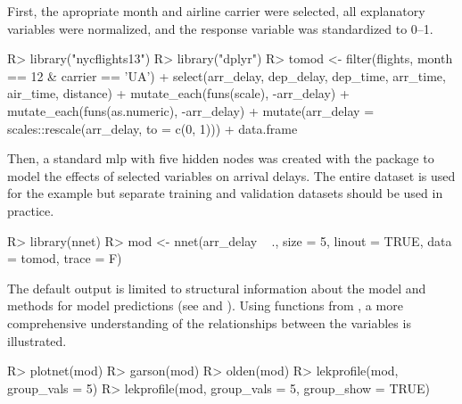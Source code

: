 \documentclass[article,shortnames]{jss}
\begin{document}
First, the apropriate month and airline carrier were selected, all explanatory variables were normalized, and the response variable was standardized to 0--1.
\begin{Schunk}
\begin{Sinput}
R> library("nycflights13")
R> library("dplyr")
R> tomod <- filter(flights, month == 12 & carrier == 'UA') %
+   select(arr_delay, dep_delay, dep_time, arr_time, air_time, distance) %
+   mutate_each(funs(scale), -arr_delay) %
+   mutate_each(funs(as.numeric), -arr_delay) %
+   mutate(arr_delay = scales::rescale(arr_delay, to = c(0, 1))) %
+   data.frame
\end{Sinput}
\end{Schunk}
Then, a standard \ac{mlp} with five hidden nodes was created with the  package to model the effects of selected variables on arrival delays. The entire dataset is used for the example but separate training and validation datasets should be used in practice.  
\begin{Schunk}
\begin{Sinput}
R> library(nnet)
R> mod <- nnet(arr_delay ~ ., size = 5, linout = TRUE, data = tomod, trace = F)  
\end{Sinput}
\end{Schunk}
The default output is limited to structural information about the model and methods for model predictions (see  and ). Using functions from , a more comprehensive understanding of the relationships between the variables is illustrated.
\begin{Schunk}
\begin{Sinput}
R> plotnet(mod)
R> garson(mod)
R> olden(mod)
R> lekprofile(mod, group_vals = 5)
R> lekprofile(mod, group_vals = 5, group_show = TRUE)
\end{Sinput}
\end{Schunk}
\end{document}
